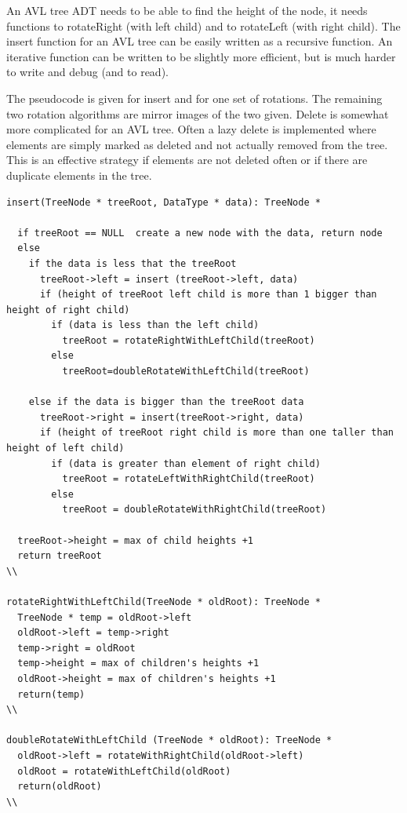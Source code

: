 An AVL tree ADT needs to be able to find the height of the node, it needs functions to rotateRight (with left child) and to rotateLeft (with right child). The insert function for an AVL tree can be easily written as a recursive function. An iterative function can be written to be slightly more efficient, but is much harder to write and debug (and to read).

The pseudocode is given for insert and for one set of rotations. The remaining two rotation algorithms are mirror images of the two given. Delete is somewhat more complicated for an AVL tree. Often a lazy delete is implemented where elements are simply marked as deleted and not actually removed from the tree. This is an effective strategy if elements are not deleted often or if there are duplicate elements in the tree.
\begin{verbatim}
insert(TreeNode * treeRoot, DataType * data): TreeNode *

  if treeRoot == NULL  create a new node with the data, return node
  else
    if the data is less that the treeRoot
      treeRoot->left = insert (treeRoot->left, data)
      if (height of treeRoot left child is more than 1 bigger than height of right child)
        if (data is less than the left child)
          treeRoot = rotateRightWithLeftChild(treeRoot)
        else
          treeRoot=doubleRotateWithLeftChild(treeRoot)
          
    else if the data is bigger than the treeRoot data
      treeRoot->right = insert(treeRoot->right, data)
      if (height of treeRoot right child is more than one taller than height of left child)
        if (data is greater than element of right child)
          treeRoot = rotateLeftWithRightChild(treeRoot)
        else
          treeRoot = doubleRotateWithRightChild(treeRoot)
          
  treeRoot->height = max of child heights +1
  return treeRoot
\\

rotateRightWithLeftChild(TreeNode * oldRoot): TreeNode *
  TreeNode * temp = oldRoot->left
  oldRoot->left = temp->right
  temp->right = oldRoot
  temp->height = max of children's heights +1
  oldRoot->height = max of children's heights +1
  return(temp)
\\

doubleRotateWithLeftChild (TreeNode * oldRoot): TreeNode *
  oldRoot->left = rotateWithRightChild(oldRoot->left)
  oldRoot = rotateWithLeftChild(oldRoot)
  return(oldRoot)
\\ 	
\end{verbatim}
\newpage
